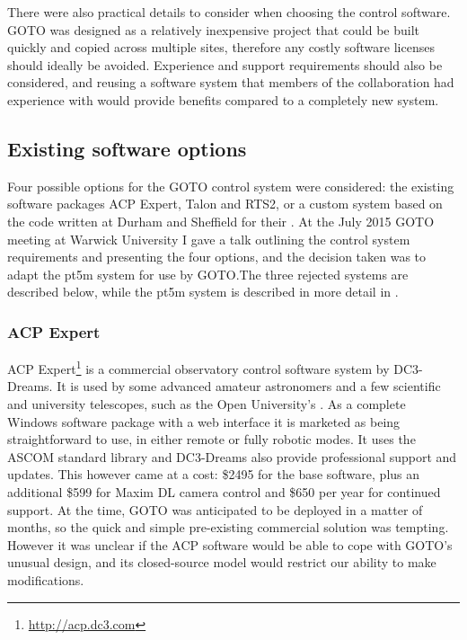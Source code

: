 \begin{colsection}
\begin{colsection}
There were also practical details to consider when choosing the control software. GOTO was designed as a relatively inexpensive project that could be built quickly and copied across multiple sites, therefore any costly software licenses should ideally be avoided. Experience and support requirements should also be considered, and reusing a software system that members of the collaboration had experience with would provide benefits compared to a completely new system.

\end{colsection}


\subsection{Existing software options}
\label{sec:control_options}
\begin{colsection}

Four possible options for the GOTO control system were considered: the existing software packages ACP Expert, Talon and RTS2, or a custom system based on the code written at Durham and Sheffield for their . At the July 2015 GOTO meeting at Warwick University I gave a talk outlining the control system requirements and presenting the four options, and the decision taken was to adapt the pt5m system for use by GOTO.\@ The three rejected systems are described below, while the pt5m system is described in more detail in .

\subsubsection{ACP Expert}

ACP Expert\footnote{\url{http://acp.dc3.com}} is a commercial observatory control software system by DC3-Dreams. It is used by some advanced amateur astronomers and a few scientific and university telescopes, such as the Open University's  \citep{PIRATE}. As a complete Windows software package with a web interface it is marketed as being straightforward to use, in either remote or fully robotic modes. It uses the ASCOM standard library and DC3-Dreams also provide professional support and updates. This however came at a cost: \$2495 for the base software, plus an additional \$599 for Maxim DL camera control and \$650 per year for continued support. At the time, GOTO was anticipated to be deployed in a matter of months, so the quick and simple pre-existing commercial solution was tempting. However it was unclear if the ACP software would be able to cope with GOTO's unusual design, and its closed-source model would restrict our ability to make modifications.


\end{colsection}
\end{colsection}
